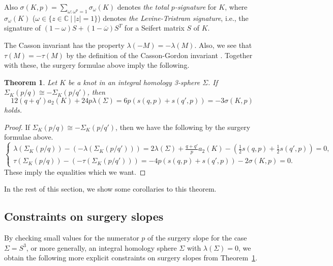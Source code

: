 \documentclass{amsart}
\newtheorem{theorem}{Theorem}[section]
\theoremstyle{remark}
\theoremstyle{definition}
\begin{document}
Also $\sigma(K,p)= \sum_{\omega: \omega^{p}=1}\sigma_{\omega}(K)$ denotes \textit{the total $p$-signature} for $K$, where $\sigma_{\omega}(K)$ ($\omega \in \{z \in \mathbb{C}\: | \: |z|=1 \}$) denotes \textit{the Levine-Tristram signature}, i.e., the signature of $(1-\omega)S + (1-\overline{\omega})S^{T}$ for a Seifert matrix $S$ of $K$.


The Casson invariant has the property $\lambda(-M)=-\lambda(M)$. 
Also, we see that $\tau(M)=-\tau(M)$ by the definition of the Casson-Gordon invariant \cite[Definition 2.20]{BoyerLines}. 
Together with these, the surgery formulae above imply the following. 

\begin{theorem}
\label{theorem:cassonobst}
Let $K$ be a knot in an integral homology 3-sphere $\Sigma$. 
If $ \Sigma_{K}(p\slash q) \cong -\Sigma_{K}(p\slash q')$, 
then 
\[ 12(q+q')a_{2}(K)+ 24p \lambda(\Sigma)= 6p ( s(q,p) + s(q',p) ) = - 3\sigma(K,p)\]
holds. 
\end{theorem}

\begin{proof}
If $ \Sigma_{K}(p\slash q) \cong -\Sigma_{K}(p\slash q')$, then we have the following by the surgery formulae above. 
\[\begin{cases}
 \lambda(\Sigma_{K}(p\slash q)) - \left( - \lambda(\Sigma_{K}(p\slash q')) \right) = 2\lambda(\Sigma) +\frac{q+q'}{p} a_{2}(K) - \left( \frac{1}{2}s(q,p) + \frac{1}{2}s(q',p) \right) = 0, \\
\tau(\Sigma_{K}(p\slash q)) - \left( - \tau( \Sigma_{K}(p\slash q') ) \right) = -4 p \left( s(q,p) + s(q',p) \right)  -2 \sigma(K,p)=0.
\end{cases}
\]
These imply the equalities which we want. 
\end{proof}

In the rest of this section, we show some corollaries to this theorem.

\subsection{Constraints on surgery slopes}

By checking small values for the numerator $p$ of the surgery slope for the case $\Sigma=S^{3}$, or more generally, an integral homology sphere $\Sigma$ with $\lambda(\Sigma)=0$, we obtain the following more explicit constraints on surgery slopes from Theorem~\ref{theorem:cassonobst}. 
\end{document}
